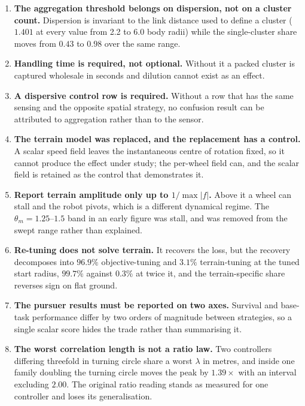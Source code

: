 \documentclass[11pt,a4paper]{article}
\begin{document}
\begin{enumerate}
\item \textbf{The aggregation threshold belongs on dispersion, not on a cluster
count.} Dispersion is invariant to the link distance used to define a cluster
($1.401$ at every value from 2.2 to 6.0 body radii) while the single-cluster
share moves from $0.43$ to $0.98$ over the same range.

\item \textbf{Handling time is required, not optional.} Without it a packed
cluster is captured wholesale in seconds and dilution cannot exist as an effect.

\item \textbf{A dispersive control row is required.} Without a row that has the
same sensing and the opposite spatial strategy, no confusion result can be
attributed to aggregation rather than to the sensor.

\item \textbf{The terrain model was replaced, and the replacement has a control.}
A scalar speed field leaves the instantaneous centre of rotation fixed, so it
cannot produce the effect under study; the per-wheel field can, and the scalar
field is retained as the control that demonstrates it.

\item \textbf{Report terrain amplitude only up to $1/\max|f|$.} Above it a wheel
can stall and the robot pivots, which is a different dynamical regime. The
$\theta_m = 1.25$--$1.5$ band in an early figure was stall, and was removed from
the swept range rather than explained.

\item \textbf{Re-tuning does not solve terrain.} It recovers the loss, but the
recovery decomposes into $96.9\%$ objective-tuning and $3.1\%$ terrain-tuning at
the tuned start radius, $99.7\%$ against $0.3\%$ at twice it, and the
terrain-specific share reverses sign on flat ground.

\item \textbf{The pursuer results must be reported on two axes.} Survival and
base-task performance differ by two orders of magnitude between strategies, so a
single scalar score hides the trade rather than summarising it.

\item \textbf{The worst correlation length is not a ratio law.} Two controllers
differing threefold in turning circle share a worst $\lambda$ in metres, and
inside one family doubling the turning circle moves the peak by $1.39\times$
with an interval excluding $2.00$. The original ratio reading stands as measured
for one controller and loses its generalisation.


\end{enumerate}
\end{document}

